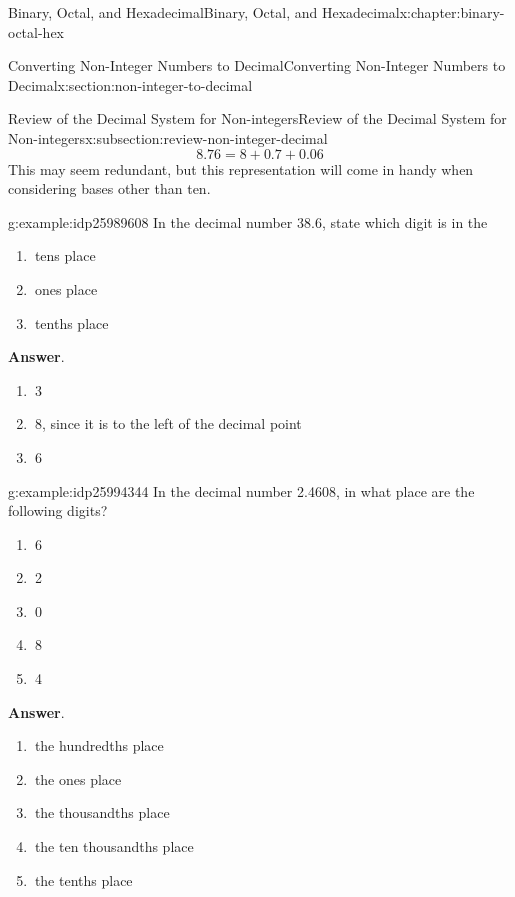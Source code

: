 \documentclass[twoside,10pt,]{book}
\newcommand{\blocktitlefont}{\relax}
\numberwithin{equation}{section}
\begin{document}
\begin{chapterptx}{Binary, Octal, and Hexadecimal}{}{Binary, Octal, and Hexadecimal}{}{}{x:chapter:binary-octal-hex}
\begin{sectionptx}{Converting Non-Integer Numbers to Decimal}{}{Converting Non-Integer Numbers to Decimal}{}{}{x:section:non-integer-to-decimal}
\begin{subsectionptx}{Review of the Decimal System for Non-integers}{}{Review of the Decimal System for Non-integers}{}{}{x:subsection:review-non-integer-decimal}
\begin{equation*}
8.76=8+0.7+0.06
\end{equation*}
This may seem redundant, but this representation will come in handy when considering bases other than ten.%
\begin{example}{}{g:example:idp25989608}%
In the decimal number 38.6, state which digit is in the %
\begin{enumerate}
\item{}\(\ \)tens place%
\item{}\(\ \)ones place%
\item{}\(\ \)tenths place%
\end{enumerate}
\par\smallskip%
\noindent\textbf{\blocktitlefont Answer}.\label{g:answer:idp25988072}{}\hypertarget{g:answer:idp25988072}{}\quad{}%
\begin{enumerate}
\item{}\(\ \)3%
\item{}\(\ \)8, since it is to the left of the decimal point%
\item{}\(\ \)6%
\end{enumerate}
\end{example}
\begin{example}{}{g:example:idp25994344}%
In the decimal number 2.4608, in what place are the following digits? %
\begin{enumerate}
\item{}\(\ \)6%
\item{}\(\ \)2%
\item{}\(\ \)0%
\item{}\(\ \)8%
\item{}\(\ \)4%
\end{enumerate}
\par\smallskip%
\noindent\textbf{\blocktitlefont Answer}.\label{g:answer:idp25992680}{}\hypertarget{g:answer:idp25992680}{}\quad{}%
\begin{enumerate}
\item{}\(\ \)the hundredths place%
\item{}\(\ \)the ones place%
\item{}\(\ \)the thousandths place%
\item{}\(\ \)the ten thousandths place%
\item{}\(\ \)the tenths place%
\end{enumerate}
\end{example}
\end{subsectionptx}
%
%
\typeout{************************************************}

\end{sectionptx}
\end{chapterptx}
\end{document}
